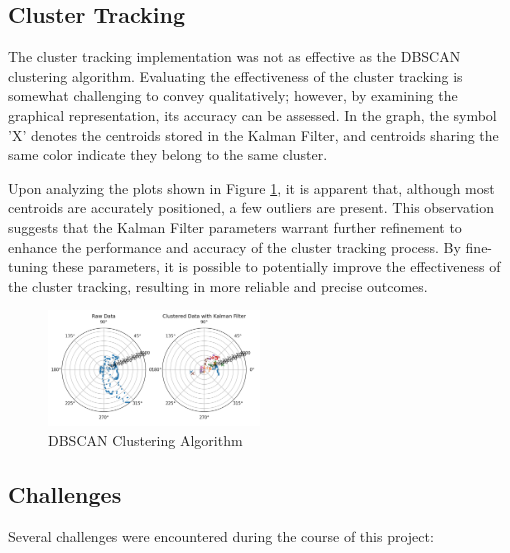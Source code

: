 \documentclass[journal]{IEEEtran} %
\begin{document}
\subsection{Cluster Tracking}
The cluster tracking implementation was not as effective as the DBSCAN clustering algorithm. Evaluating the effectiveness of the cluster tracking is somewhat challenging to convey qualitatively; however, by examining the graphical representation, its accuracy can be assessed. In the graph, the symbol 'X' denotes the centroids stored in the Kalman Filter, and centroids sharing the same color indicate they belong to the same cluster.

Upon analyzing the plots shown in Figure \ref{fig:kalmanFilter}, it is apparent that, although most centroids are accurately positioned, a few outliers are present. This observation suggests that the Kalman Filter parameters warrant further refinement to enhance the performance and accuracy of the cluster tracking process. By fine-tuning these parameters, it is possible to potentially improve the effectiveness of the cluster tracking, resulting in more reliable and precise outcomes.

\begin{figure}[h]
  \centering
  \includegraphics[width=0.5\textwidth]{kalmanFilter.PNG}
  \caption{DBSCAN Clustering Algorithm}
  \label{fig:kalmanFilter}
\end{figure}

\subsection{Challenges}
Several challenges were encountered during the course of this project:
\end{document}
